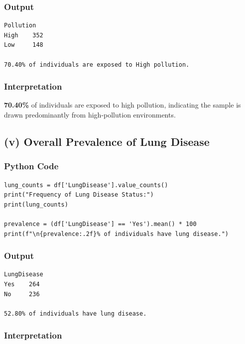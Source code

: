 \documentclass[12pt,a4paper]{article}
\begin{document}
\subsubsection{Output}

\begin{lstlisting}[style=outputstyle]
Pollution
High    352
Low     148

70.40% of individuals are exposed to High pollution.
\end{lstlisting}

\subsubsection{Interpretation}

\textbf{70.40\%} of individuals are exposed to high pollution, indicating the sample is drawn predominantly from high-pollution environments.

\subsection{(v) Overall Prevalence of Lung Disease}

\subsubsection{Python Code}

\begin{lstlisting}[style=pythonstyle, caption={Lung disease prevalence}]
lung_counts = df['LungDisease'].value_counts()
print("Frequency of Lung Disease Status:")
print(lung_counts)

prevalence = (df['LungDisease'] == 'Yes').mean() * 100
print(f"\n{prevalence:.2f}% of individuals have lung disease.")
\end{lstlisting}

\subsubsection{Output}

\begin{lstlisting}[style=outputstyle]
LungDisease
Yes    264
No     236

52.80% of individuals have lung disease.
\end{lstlisting}

\subsubsection{Interpretation}
\end{document}
